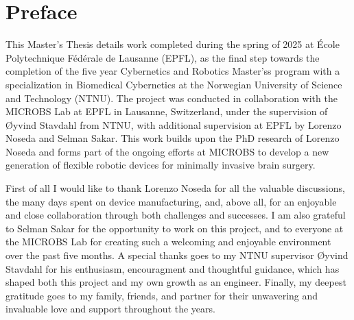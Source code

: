 
\section*{Preface}




This Master's Thesis details work completed during the spring of 2025 at École Polytechnique Fédérale de Lausanne (EPFL), as the final step towards the completion of the five year Cybernetics and Robotics Master'ss program with a specialization in Biomedical Cybernetics at the Norwegian University of Science and Technology (NTNU). The project was conducted in collaboration with the MICROBS Lab at EPFL in Lausanne, Switzerland, under the supervision of Øyvind Stavdahl from NTNU, with additional supervision at EPFL by Lorenzo Noseda and Selman Sakar. This work builds upon the PhD research of Lorenzo Noseda and forms part of the ongoing efforts at MICROBS to develop a new generation of flexible robotic devices for minimally invasive brain surgery.

First of all I would like to thank Lorenzo Noseda for all the valuable discussions, the many days spent on device manufacturing, and, above all, for an enjoyable and close collaboration through both challenges and successes. I am also grateful to Selman Sakar for the opportunity to work on this project, and to everyone at the MICROBS Lab for creating such a welcoming and enjoyable environment over the past five months. A special thanks goes to my NTNU supervisor Øyvind Stavdahl for his enthusiasm, encouragment and thoughtful guidance, which has shaped both this project and my own growth as an engineer. Finally, my deepest gratitude goes to my family, friends, and partner for their unwavering and invaluable love and support throughout the years.




